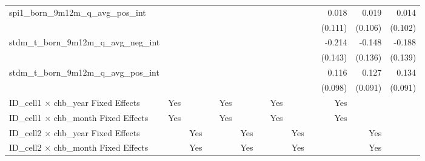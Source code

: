 \begin{tabular}{lrrrrrrrrrrrr}
spi1\_born\_9m12m\_q\_avg\_pos\_int         &              &              &              &              &              &              &              &              &              &        0.018 &        0.019 &        0.014 \\ 
                                            &              &              &              &              &              &              &              &              &              &      (0.111) &      (0.106) &      (0.102) \\ 
stdm\_t\_born\_9m12m\_q\_avg\_neg\_int      &              &              &              &              &              &              &              &              &              &       -0.214 &       -0.148 &       -0.188 \\ 
                                            &              &              &              &              &              &              &              &              &              &      (0.143) &      (0.136) &      (0.139) \\ 
stdm\_t\_born\_9m12m\_q\_avg\_pos\_int      &              &              &              &              &              &              &              &              &              &        0.116 &        0.127 &        0.134 \\ 
                                            &              &              &              &              &              &              &              &              &              &      (0.098) &      (0.091) &      (0.091) \\ 
\midrule
ID\_cell1 $\times$ chb\_year Fixed Effects  &          Yes &              &              &          Yes &              &              &          Yes &              &              &          Yes &              &              \\ 
ID\_cell1 $\times$ chb\_month Fixed Effects &          Yes &              &              &          Yes &              &              &          Yes &              &              &          Yes &              &              \\ 
ID\_cell2 $\times$ chb\_year Fixed Effects  &              &          Yes &              &              &          Yes &              &              &          Yes &              &              &          Yes &              \\ 
ID\_cell2 $\times$ chb\_month Fixed Effects &              &          Yes &              &              &          Yes &              &              &          Yes &              &              &          Yes &              \\ 

\end{tabular}
